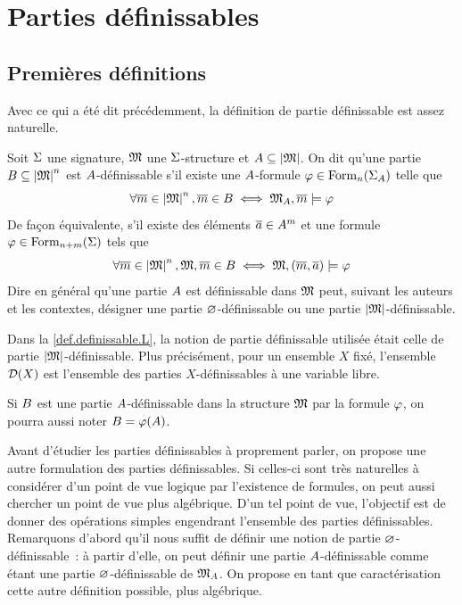 \section{Parties définissables}

\subsection{Premières définitions}

Avec ce qui a été dit précédemment, la définition de partie définissable est
assez naturelle.

\begin{definition}
  Soit $\Sigma$ une signature, $\mathfrak{M}$ une $\Sigma$-structure et
  $A\subseteq\left\vert \mathfrak{M}\right\vert$. On dit qu'une partie
  $B\subseteq\left\vert \mathfrak{M}\right\vert^n$ est $A$-définissable s'il existe une
  $A$-formule $\varphi\in\operatorname{Form}_n(\Sigma_{A})$ telle que
  \[\forall \overline{m} \in \left\vert \mathfrak{M}\right\vert^n, \overline{m}\in B \iff
  \mathfrak{M}_{A},\overline{m}\models\varphi\]
  De façon équivalente, s'il existe des éléments $\overline{a} \in A^m$ et une
  formule $\varphi\in\operatorname{Form}_{n+m}(\Sigma)$ tels que
  \[\forall \overline{m} \in \left\vert \mathfrak{M}\right\vert^n, \mathfrak{M},\overline{m} \in B \iff
  \mathfrak{M},(\overline{m},\overline{a})\models\varphi\]
  Dire en général qu'une partie $A$ est définissable dans $\mathfrak{M}$ peut,
  suivant les auteurs et les contextes, désigner une partie $\varnothing$-définissable
  ou une partie $\left\vert \mathfrak{M}\right\vert$-définissable.
\end{definition}

\begin{remark}
  Dans la \cref{def.definissable.L}, la notion de partie définissable
  utilisée était celle de partie $\left\vert \mathfrak{M}\right\vert$-définissable. Plus précisément,
  pour un ensemble $X$ fixé, l'ensemble $\mathcal{D}(X)$ est l'ensemble des
  parties $X$-définissables à une variable libre.
\end{remark}

\begin{notation}
  Si $B$ est une partie $A$-définissable dans la structure $\mathfrak{M}$
  par la formule $\varphi$, on pourra aussi noter $B = \varphi(A)$.
\end{notation}

Avant d'étudier les parties définissables à proprement parler, on propose une
autre formulation des parties définissables. Si celles-ci sont très naturelles
à considérer d'un point de vue logique par l'existence de formules, on peut
aussi chercher un point de vue plus algébrique. D'un tel point de vue,
l'objectif est de donner des opérations simples engendrant l'ensemble des
parties définissables. Remarquons d'abord qu'il nous suffit de définir une
notion de partie $\varnothing$-définissable~: à partir d'elle, on peut définir une
partie $A$-définissable comme étant une partie $\varnothing$-définissable de
$\mathfrak{M}_{A}$. On propose en tant que caractérisation cette autre
définition possible, plus algébrique.


